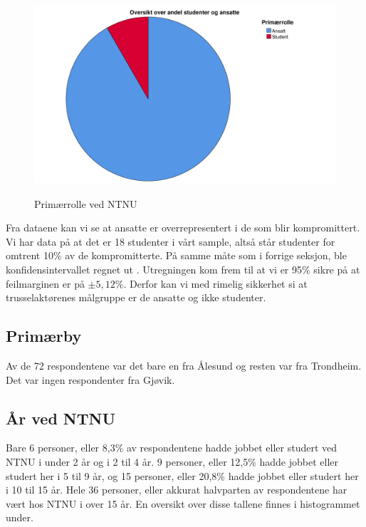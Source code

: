 \begin{figure}[H]
    \centering
    \includegraphics[scale=0.5]{case_2/bilder/spss/primaerrolle.pdf}
    \label{fig:primaerrolle}
    \caption[primaerrolle]{Primærrolle ved NTNU}
\end{figure}

Fra dataene kan vi se at ansatte er overrepresentert i de som blir kompromittert. Vi har data på at det er 18 studenter i vårt sample, altså står studenter for omtrent 10\% av de kompromitterte. På samme måte som i forrige seksjon, ble konfidensintervallet regnet ut \cite{SSCalc}. Utregningen kom frem til at vi er 95\% sikre på at feilmarginen er på \(\pm 5,12\%\). Derfor kan vi med rimelig sikkerhet si at trusselaktørenes målgruppe er de ansatte og ikke studenter. 

\subsection{Primærby}
Av de 72 respondentene var det bare en fra Ålesund og resten var fra Trondheim. Det var ingen respondenter fra Gjøvik. 

\subsection{År ved NTNU}
Bare 6 personer, eller 8,3\% av respondentene hadde jobbet eller studert ved NTNU i under 2 år og i 2 til 4 år. 9 personer, eller 12,5\% hadde jobbet eller studert her i 5 til 9 år, og 15 personer, eller 20,8\% hadde jobbet eller studert her i 10 til 15 år. Hele 36 personer, eller akkurat halvparten av respondentene har vært hos NTNU i over 15 år. En oversikt over disse tallene finnes i histogrammet under. 

